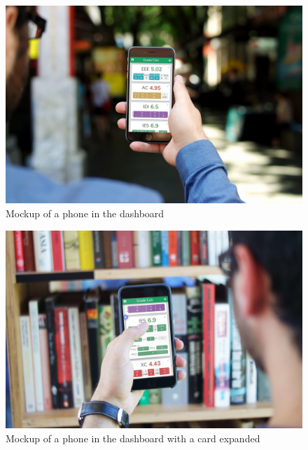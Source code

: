 \clearpage\newpage

\begin{figure}[ht!]
    \center
    \includegraphics[width=0.85\columnwidth]{media/mockups/mockup-phone-home.jpg}
    \caption{Mockup of a phone in the dashboard}
    \label{fig:mockup-phone-home}
\end{figure}
\vfill
\begin{figure}[ht!]
    \center
    \includegraphics[width=0.85\columnwidth]{media/mockups/mockup-phone-typing.jpg}
    \caption{Mockup of a phone in the dashboard with a card expanded}
    \label{fig:mockup-phone-home}
\end{figure}

\clearpage\newpage

